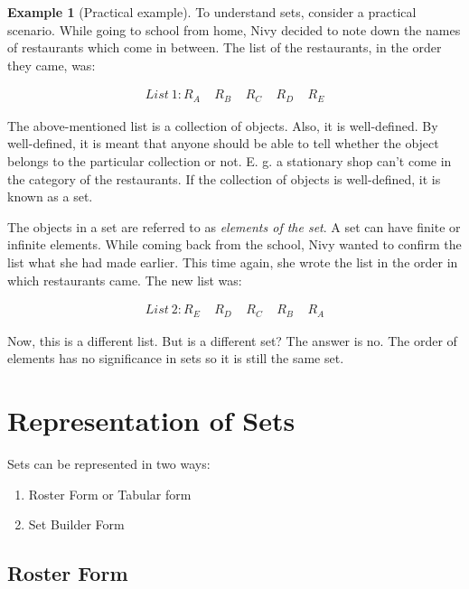 \documentclass[
]{book}
\theoremstyle{definition}
\theoremstyle{definition}
\newtheorem{example}{Example}[chapter]
\theoremstyle{definition}
\theoremstyle{definition}
\theoremstyle{remark}
\begin{document}
\begin{example}[Practical example]
\protect\hypertarget{exm:ex1}{}\label{exm:ex1}To understand sets, consider a practical scenario. While going to school from home, Nivy decided to note down the names of restaurants which come in between. The list of the restaurants, in the order they came, was:

\[ \begin{array}{l} List\ 1: R_A ~~~~~       R_B ~~~~~       R_C ~~~~~       R_D ~~~~~       R_E \end{array}\]

The above-mentioned list is a collection of objects. Also, it is well-defined. By well-defined, it is meant that anyone should be able to tell whether the object belongs to the particular collection or not. E. g. a stationary shop can't come in the category of the restaurants. If the collection of objects is well-defined, it is known as a set.

The objects in a set are referred to as \emph{elements of the set}. A set can have finite or infinite elements. While coming back from the school, Nivy wanted to confirm the list what she had made earlier. This time again, she wrote the list in the order in which restaurants came. The new list was:

\[ \begin{array}{l}List\ 2: R_E ~~~~~        R_D~~~~~        R_C ~~~~~       R_B  ~~~~~      R_A \end{array}\]

Now, this is a different list. But is a different set? The answer is no. The order of elements has no significance in sets so it is still the same set.
\end{example}

\hypertarget{representation-of-sets}{%
\section{Representation of Sets}\label{representation-of-sets}}

Sets can be represented in two ways:

\begin{enumerate}
\def\labelenumi{\arabic{enumi}.}
\item
  Roster Form or Tabular form
\item
  Set Builder Form
\end{enumerate}

\hypertarget{roster-form}{%
\subsection{Roster Form}\label{roster-form}}
\end{document}
